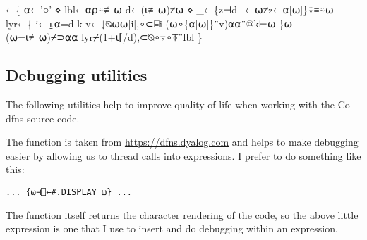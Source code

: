 \documentclass{article}%
\begin{document}
←\{
        ⍺←'○' ⋄ lbl←⍺⍴⍨≢⍵
        d←(⍳≢⍵)≠⍵ ⋄ _←\{z⊣d+←⍵≠z←⍺[⍵]\}⍣≡⍨⍵
        lyr←\{
                i←⍸⍺=d
                k v←↓⍉⍵⍵[i],∘⊂⌸i
                (⍵∘\{⍺[⍵]\}¨v)⍺⍺¨@k⊢⍵
        \}⍵
        (⍵=⍳≢⍵)⌿⊃⍺⍺ lyr⌿(1+⍳⌈/d),⊂⍉∘⍪∘⍕¨lbl
\}
\eatline
{}\nwendcode{}\nwdocspar
\subsection{Debugging utilities}

The following utilities help to improve quality of life when working
with the Co-dfns source code.

The {\Tt{}\nwendquote} function is taken from \url{https://dfns.dyalog.com}
and helps to make debugging easier by allowing us to thread
{\Tt{}\nwendquote} calls into expressions. I prefer to do something like
this:

\begin{verbatim}
... {⍵⊣⎕←#.DISPLAY ⍵} ...
\end{verbatim}

\noindent
The function itself returns the character rendering of the code,
so the above little expression is one that I use to insert and do
debugging within an expression.
\end{document}

